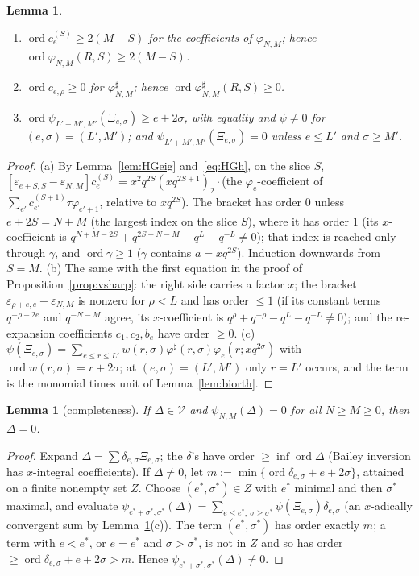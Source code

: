 \documentclass[11pt]{amsart}
\newtheorem{lemma}[theorem]{Lemma}
\theoremstyle{definition}
\numberwithin{equation}{section}
\begin{document}
\begin{lemma}\label{lem:val}
\begin{enumerate}[label=(\alph*)]
\item $\operatorname{ord}c^{(S)}_e\ge2(M-S)$ for the coefficients of $\varphi_{N,M}$; hence $\operatorname{ord}\varphi_{N,M}(R,S)\ge2(M-S)$.
\item $\operatorname{ord}c_{e,\rho}\ge0$ for $\varphi^\sharp_{N,M}$; hence $\operatorname{ord}\varphi^\sharp_{N,M}(R,S)\ge0$.
\item $\operatorname{ord}\psi_{L'+M',M'}(\Xi_{e,\sigma})\ge e+2\sigma$, with equality and $\psi\ne0$ for $(e,\sigma)=(L',M')$; and
$\psi_{L'+M',M'}(\Xi_{e,\sigma})=0$ unless $e\le L'$ and $\sigma\ge M'$.
\end{enumerate}
\end{lemma}
\begin{proof}
(a) By Lemma~\ref{lem:HGeig} and~\eqref{eq:HGh}, on the slice $S$,
$[\varepsilon_{e+S,S}-\varepsilon_{N,M}]c^{(S)}_e=x^2q^{2S}(xq^{2S+1})_2\cdot$(the $\varphi_e$-coefficient of
$\sum_{e'}c^{(S+1)}_{e'}\tau\varphi_{e'+1}$, relative to $xq^{2S}$). The bracket has order $0$ unless $e+2S=N+M$ (the largest
index on the slice $S$), where it has order $1$ (its $x$-coefficient is $q^{N+M-2S}+q^{2S-N-M}-q^L-q^{-L}\ne0$); that
index is reached only through $\gamma$, and $\operatorname{ord}\gamma\ge1$ ($\gamma$ contains $a=xq^{2S}$). Induction downwards
from $S=M$.
(b) The same with the first equation in the proof of Proposition~\ref{prop:vsharp}: the right side carries a factor
$x$; the bracket $\varepsilon_{\rho+e,e}-\varepsilon_{N,M}$ is nonzero for $\rho<L$ and has order $\le1$ (if its constant
terms $q^{-\rho-2e}$ and $q^{-N-M}$ agree, its $x$-coefficient is $q^\rho+q^{-\rho}-q^L-q^{-L}\ne0$); and the
re-expansion coefficients $c_1,c_2,b_e$ have order $\ge0$.
(c) $\psi(\Xi_{e,\sigma})=\sum_{e\le r\le L'}w(r,\sigma)\varphi^\sharp(r,\sigma)\varphi_e(r;xq^{2\sigma})$ with
$\operatorname{ord}w(r,\sigma)=r+2\sigma$; at $(e,\sigma)=(L',M')$ only $r=L'$ occurs, and the term is the monomial times
unit of Lemma~\ref{lem:biorth}.
\end{proof}

\begin{lemma}[completeness]\label{lem:compl}
If $\Delta\in\mathcal V$ and $\psi_{N,M}(\Delta)=0$ for all $N\ge M\ge0$, then $\Delta=0$.
\end{lemma}
\begin{proof}
Expand $\Delta=\sum\delta_{e,\sigma}\Xi_{e,\sigma}$; the $\delta$'s have order $\ge\inf\operatorname{ord}\Delta$ (Bailey
inversion has $x$-integral coefficients). If $\Delta\ne0$, let $m:=\min\{\operatorname{ord}\delta_{e,\sigma}+e+2\sigma\}$,
attained on a finite nonempty set $Z$. Choose $(e^*,\sigma^*)\in Z$ with $e^*$ minimal and then $\sigma^*$ maximal, and
evaluate $\psi_{e^*+\sigma^*,\sigma^*}(\Delta)=\sum_{e\le e^*,\ \sigma\ge\sigma^*}\psi(\Xi_{e,\sigma})\delta_{e,\sigma}$ (an
$x$-adically convergent sum by Lemma~\ref{lem:val}(c)). The term $(e^*,\sigma^*)$ has order exactly $m$; a term with
$e<e^*$, or $e=e^*$ and $\sigma>\sigma^*$, is not in $Z$ and so has order $\ge\operatorname{ord}\delta_{e,\sigma}+e+2\sigma>m$.
Hence $\psi_{e^*+\sigma^*,\sigma^*}(\Delta)\ne0$.
\end{proof}
\end{document}
